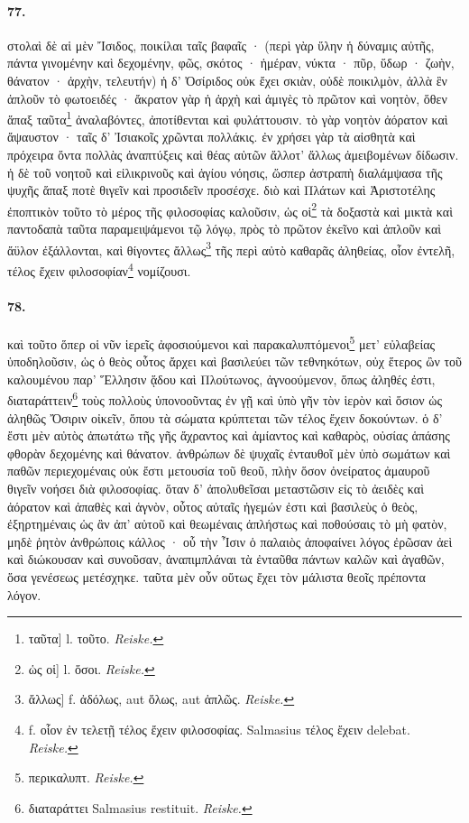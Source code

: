 \documentclass[a4paper, 11pt, oneside, polutonikogreek, german]{article}
\begin{document}
\paragraph{77.}
στολαὶ δὲ αἱ μὲν Ἴσιδος, ποικίλαι ταῖς βαφαῖς · (περὶ γὰρ ὕλην ἡ δύναμις αὐτῆς, πάντα γινομένην καὶ δεχομένην, φῶς, σκότος · ἡμέραν, νύκτα · πῦρ, ὕδωρ · ζωὴν, θάνατον · ἀρχὴν, τελευτήν) ἡ δ' Ὀσίριδος οὐκ ἔχει σκιὰν, οὐδὲ ποικιλμὸν, ἀλλὰ ἓν ἁπλοῦν τὸ φωτοειδές · ἄκρατον γὰρ ἡ ἀρχὴ καὶ ἀμιγὲς τὸ πρῶτον καὶ νοητὸν, ὅθεν ἅπαξ ταῦτα\footnote{ταῦτα] l. τοῦτο. \emph{Reiske.}} ἀναλαβόντες, ἀποτίθενται καὶ φυλάττουσιν. τὸ γὰρ νοητὸν ἀόρατον καὶ ἄψαυστον · ταῖς δ' Ἰσιακοῖς χρῶνται πολλάκις. ἐν χρήσει γὰρ τὰ αἰσθητὰ καὶ πρόχειρα ὄντα πολλὰς ἀναπτύξεις καὶ θέας αὑτῶν ἄλλοτ' ἄλλως ἀμειβομένων δίδωσιν. ἡ δὲ τοῦ νοητοῦ καὶ εἰλικρινοῦς καὶ ἁγίου νόησις, ὥσπερ ἀστραπὴ διαλάμψασα τῆς ψυχῆς ἅπαξ ποτὲ θιγεῖν καὶ προσιδεῖν προσέσχε. διὸ καὶ Πλάτων καὶ Ἀριστοτέλης ἐποπτικὸν τοῦτο τὸ μέρος τῆς φιλοσοφίας καλοῦσιν, ὡς οἱ\footnote{ὡς οἱ] l. ὅσοι. \emph{Reiske.}} τὰ δοξαστὰ καὶ μικτὰ καὶ παντοδαπὰ ταῦτα παραμειψάμενοι τῷ λόγῳ, πρὸς τὸ πρῶτον ἐκεῖνο καὶ ἁπλοῦν καὶ ἄϋλον ἐξάλλονται, καὶ θίγοντες ἄλλως\footnote{ἄλλως] f. ἀδόλως, aut ὅλως, aut ἁπλῶς. \emph{Reiske.} } τῆς περὶ αὐτὸ καθαρᾶς ἀληθείας, οἷον ἐντελῆ, τέλος ἔχειν φιλοσοφίαν\footnote{f. οἷον ἐν τελετῇ τέλος ἔχειν φιλοσοφίας. Salmasius τέλος ἔχειν delebat. \emph{Reiske.}} νομίζουσι.

\paragraph{78.}
καὶ τοῦτο ὅπερ οἱ νῦν ἱερεῖς ἀφοσιούμενοι καὶ παρακαλυπτόμενοι\footnote{περικαλυπτ. \emph{Reiske.}} μετ' εὐλαβείας ὑποδηλοῦσιν, ὡς ὁ θεὸς οὗτος ἄρχει καὶ βασιλεύει τῶν τεθνηκότων, οὐχ ἕτερος ὢν τοῦ καλουμένου παρ' Ἕλλησιν ᾅδου καὶ Πλούτωνος, ἀγνοούμενον, ὅπως ἀληθές ἐστι, διαταράττειν\footnote{διαταράττει Salmasius restituit. \emph{Reiske.}} τοὺς πολλοὺς ὑπονοοῦντας ἐν γῇ καὶ ὑπὸ γῆν τὸν ἱερὸν καὶ ὅσιον ὡς ἀληθῶς Ὄσιριν οἰκεῖν, ὅπου τὰ σώματα κρύπτεται τῶν τέλος ἔχειν δοκούντων. ὁ δ' ἔστι μὲν αὐτὸς ἀπωτάτω τῆς γῆς ἄχραντος καὶ ἀμίαντος καὶ καθαρὸς, οὐσίας ἁπάσης φθορὰν δεχομένης καὶ θάνατον. ἀνθρώπων δὲ ψυχαῖς ἐνταυθοῖ μὲν ὑπὸ σωμάτων καὶ παθῶν περιεχομέναις οὐκ ἔστι μετουσία τοῦ θεοῦ, πλὴν ὅσον ὀνείρατος ἀμαυροῦ θιγεῖν νοήσει διὰ φιλοσοφίας. ὅταν δ' ἀπολυθεῖσαι μεταστῶσιν εἰς τὸ ἀειδὲς καὶ ἀόρατον καὶ ἀπαθὲς καὶ ἁγνὸν, οὗτος αὐταῖς ἡγεμών ἐστι καὶ βασιλεὺς ὁ θεὸς, ἐξηρτημέναις ὡς ἂν ἀπ' αὐτοῦ καὶ θεωμέναις ἀπλήστως καὶ ποθούσαις τὸ μὴ φατὸν, μηδὲ ῥητὸν ἀνθρώποις κάλλος · οὗ τὴν Ἶσιν ὁ παλαιὸς ἀποφαίνει λόγος ἐρῶσαν ἀεὶ καὶ διώκουσαν καὶ συνοῦσαν, ἀναπιμπλάναι τὰ ἐνταῦθα πάντων καλῶν καὶ ἀγαθῶν, ὅσα γενέσεως μετέσχηκε. ταῦτα μὲν οὖν οὕτως ἔχει τὸν μάλιστα θεοῖς πρέποντα λόγον.
\end{document}
